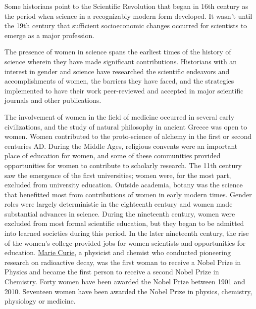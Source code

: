 Some historians point to the Scientific Revolution that began in 16th century as the period when science in a recognizably modern form developed. It wasn't until the 19th century that sufficient socioeconomic changes occurred for scientists to emerge as a major profession.

The presence of women in science spans the earliest times of the history of science wherein they have made significant contributions. Historians with an interest in gender and science have researched the scientific endeavors and accomplishments of women, the barriers they have faced, and the strategies implemented to have their work peer-reviewed and accepted in major scientific journals and other publications.

The involvement of women in the field of medicine occurred in several early civilizations, and the study of natural philosophy in ancient Greece was open to women. Women contributed to the proto-science of alchemy in the first or second centuries AD. During the Middle Ages, religious convents were an important place of education for women, and some of these communities provided opportunities for women to contribute to scholarly research. The 11th century saw the emergence of the first universities; women were, for the most part, excluded from university education. Outside academia, botany was the science that benefitted most from contributions of women in early modern times. Gender roles were largely deterministic in the eighteenth century and women made substantial advances in science. During the nineteenth century, women were excluded from most formal scientific education, but they began to be admitted into learned societies during this period. In the later nineteenth century, the rise of the women's college provided jobs for women scientists and opportunities for education. \href{https://en.wikipedia.org/wiki/Marie_Curie}{Marie Curie}, a physicist and chemist who conducted pioneering research on radioactive decay, was the first woman to receive a Nobel Prize in Physics and became the first person to receive a second Nobel Prize in Chemistry. Forty women have been awarded the Nobel Prize between 1901 and 2010. Seventeen women have been awarded the Nobel Prize in physics, chemistry, physiology or medicine.



